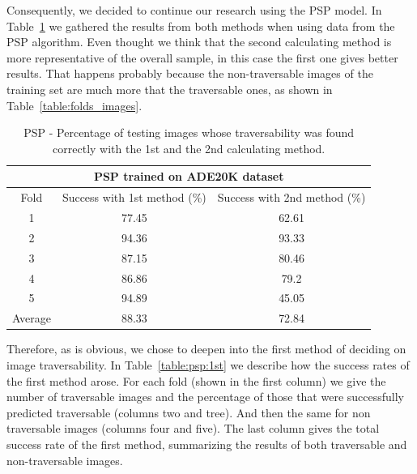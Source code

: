 \documentclass[12pt,a4paper,table,dvipsnames,tikz]{report}
\newcommand{\acronym}{\MakeUppercase}
\newcommand{\bl}[1]{{\hypersetup{linkcolor=blue}#1}}
\begin{document}
	Consequently, we decided to continue our research using the \acronym{psp} model. 
	In Table~\bl{\ref{table:psp}} we gathered the results from both methods when using data 
	from the \acronym{psp} algorithm. Even thought we think that the second calculating 
	method is more representative of the overall sample, in this case the first one gives 
	better results. That happens probably because the non-traversable images of the 
	training set are much more that the traversable ones, as shown in 
	Table~\bl{\ref{table:folds_images}}.
	\\
	
	\begin{table}[h!]
		\centering
		\begin{tabular}{|c|c|c|}
			\hline
			\multicolumn{3}{|c|}{\acronym{psp} trained on \acronym{ade20k} dataset}\\
			\hline
			Fold & Success with 1st method (\%) & Success with 2nd method (\%)\\ 
			\hline\hline
			1 & 77.45 & 62.61\\
			\hline
			2 & 94.36 & 93.33\\
			\hline
			3 & 87.15 & 80.46\\
			\hline
			4 & 86.86 & 79.2\\
			\hline
			5 & 94.89 & 45.05\\
			\hline\hline
			Average & 88.33 & 72.84\\
			\hline
		\end{tabular}
		\caption{\acronym{psp} - Percentage of testing images whose	traversability 
			was found correctly with the 1st and the 2nd calculating 
		method.}
		\label{table:psp}
	\end{table}
	
	Therefore, as is obvious, we chose to deepen into the first method of deciding on 
	image traversability. In Table~\bl{\ref{table:psp:1st}} we describe how the success 
	rates of the first method arose. For each fold (shown in the first column) we give 
	the number of traversable images and the percentage of those that were successfully 
	predicted traversable (columns two and tree). And then the same for non traversable 
	images (columns four and five). The last column gives the total success rate of the 
	first method, summarizing the results of both traversable and non-traversable images.
	\\
	
\end{document}
